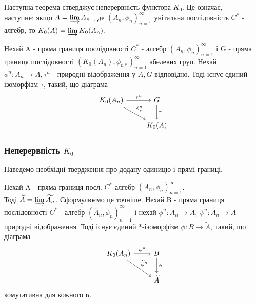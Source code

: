 Наступна теорема стверджує неперервність функтора $K_0$.
Це означає, \\ наступне: якщо $A = \varinjlim A_n$ , де $(A_n, \phi_n)_{n=1}^{\infty}$ унітальна послідовність $C^*$ - алгебр,
то $K_0(A) = \varinjlim K_0(A_n).$

\begin{theorem}
    Нехай A - пряма границя послідовності $C^*$ - алгебр $(A_n, \phi_n)_{n=1}^{\infty}$ і
    G - пряма границя послідовності $(K_0(A_n), \phi_{n*})_{n=1}^{\infty}$ абелевих груп.
    Нехай $\phi^n: A_n \rightarrow A, \tau^n$ - природні відображення у $A, G$ відповідно.
    Тоді існує єдиний ізоморфізм $\tau$, такий, що діаграма
    \begin{equation*}
        \begin{tikzcd}
            K_0(A_n) \arrow[rd, "\phi_*^n"] \arrow[r, "\tau^n"] & G \arrow[d, "\tau"] \\
            & K_0(A)
        \end{tikzcd}
    \end{equation*}

\end{theorem}

\subsubsection{Неперервність $\widetilde{K_0}$}
Наведемо необхідні твердження про додану одиницю і прямі границі.
\begin{remark}
    Нехай A - пряма границя посл. $C^*$-алгебр $(A_n, \phi_n)_{n=1}^{\infty}$. \\
    Тоді $\widetilde{A} = \varinjlim \widetilde{A_n}$.
    Сформулюємо це точніше.
    Нехай B - пряма границя \\
    послідовності $C^*$ - алгебр $(\widetilde{A_n}, \widetilde{\phi_n})_{n=1}^{\infty}$
    і нехай $\phi^n: A_n \to A$, $\psi^n: \widetilde{A_n} \to A$ природні відображення.
    Тоді існує єдиний *-ізоморфізм $\phi: B \rightarrow \widetilde{A}$, такий, що діаграма
    \begin{equation*}
        \begin{tikzcd}
            K_0(A_n) \arrow[rd, "\widetilde{\phi}^n"] \arrow[r, "\psi^n"] & B \arrow[d, "\phi"] \\
            & \widetilde{A}
        \end{tikzcd}
    \end{equation*}
    комутативна для кожного n.
\end{remark}

